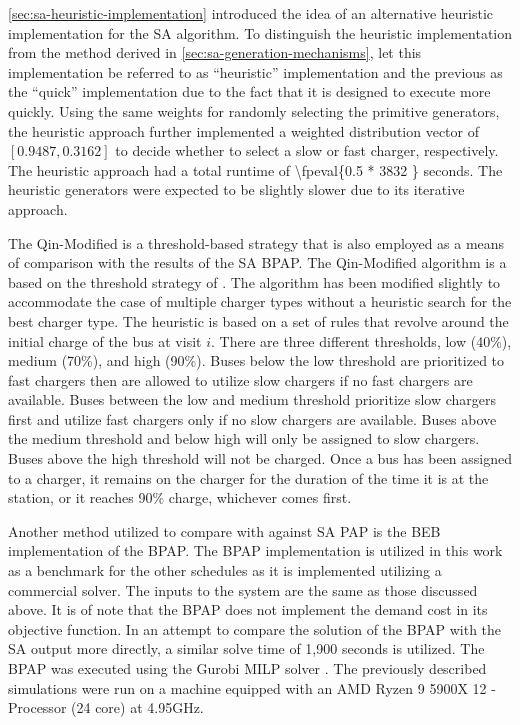 \documentclass[energies,article,submit,moreauthors]{Definitions/mdpi}
\newcommand{\tempcnt}{3832 }                                                    %
\newcommand{\heuristiclocal}{0.5 }                                              %
\begin{document}
\ref{sec:sa-heuristic-implementation} introduced the idea of an alternative heuristic implementation for the SA algorithm. To
distinguish the heuristic implementation from the method derived in \ref{sec:sa-generation-mechanisms}, let this
implementation be referred to as ``heuristic'' implementation and the previous as the ``quick'' implementation due to the
fact that it is designed to execute more quickly. Using the same weights for randomly selecting the primitive
generators, the heuristic approach further implemented a weighted distribution vector of \([0.9487, 0.3162]\) to decide
whether to select a slow or fast charger, respectively. The heuristic approach had a total runtime of
\num{\fpeval{\heuristiclocal * \tempcnt}} seconds. The heuristic generators were expected to be slightly
slower due to its iterative approach.

The Qin-Modified is a threshold-based strategy that is also employed as a means of comparison with the results of the SA
BPAP. The Qin-Modified algorithm is a based on the threshold strategy of \cite{qin-2016-numer-analy}. The algorithm has
been modified slightly to accommodate the case of multiple charger types without a heuristic search for the best charger
type. The heuristic is based on a set of rules that revolve around the initial charge of the bus at visit \(i\). There are
three different thresholds, low (40\%), medium (70\%), and high (90\%). Buses below the low threshold are prioritized to
fast chargers then are allowed to utilize slow chargers if no fast chargers are available. Buses between the low and
medium threshold prioritize slow chargers first and utilize fast chargers only if no slow chargers are available. Buses
above the medium threshold and below high will only be assigned to slow chargers. Buses above the high threshold will
not be charged. Once a bus has been assigned to a charger, it remains on the charger for the duration of the time it is
at the station, or it reaches 90\% charge, whichever comes first.

Another method utilized to compare with against SA PAP is the BEB implementation of the BPAP. The BPAP implementation is
utilized in this work as a benchmark for the other schedules as it is implemented utilizing a commercial solver. The
inputs to the system are the same as those discussed above. It is of note that the BPAP does not implement the demand
cost in its objective function. In an attempt to compare the solution of the BPAP with the SA output more directly, a
similar solve time of 1,900 seconds is utilized. The BPAP was executed using the Gurobi MILP solver
\cite{gurobi-2021-gurob-optim}. The previously described simulations were run on a machine equipped with an AMD Ryzen 9
5900X 12 - Processor (24 core) at 4.95GHz.
\end{document}
